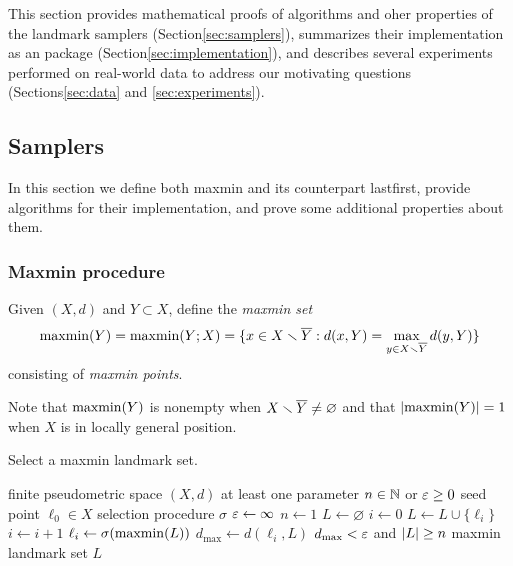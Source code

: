 \documentclass{article}
\begin{document}
\label{sec:methods}

This section provides mathematical proofs of algorithms and oher
properties of the landmark samplers (Section\nbs\ref{sec:samplers}),
summarizes their implementation as an  package
(Section\nbs\ref{sec:implementation}), and describes several experiments
performed on real-world data to address our motivating questions
(Sections\nbs\ref{sec:data} and \ref{sec:experiments}).

\hypertarget{samplers}{%
\subsection{Samplers}\label{samplers}}

\label{sec:samplers}

In this section we define both maxmin and its counterpart lastfirst,
provide algorithms for their implementation, and prove some additional
properties about them.

\hypertarget{maxmin-procedure}{%
\subsubsection{Maxmin procedure}\label{maxmin-procedure}}

\label{sec:maxmin}

\begin{definition}[maxmin]\label{def:maxmin}
    Given $(X,d)$ and $Y\subset X$, define the \emph{maxmin set}
    $$\operatorname{maxmin}(Y) = \operatorname{maxmin}(Y;X) = \{ x \in X \smallsetminus \overline{Y} : d(x,Y) = \max_{y\in X\smallsetminus \overline{Y}}{d(y,Y)} \}$$
    consisting of \emph{maxmin points}.
\end{definition}

Note that \(\operatorname{maxmin}(Y)\) is nonempty when
\(X \smallsetminus \overline{Y} \neq \varnothing\) and that \(\lvert \operatorname{maxmin}(Y)\rvert = 1\) when
\(X\) is in locally general position.

\begin{algorithm}
\caption{Select a maxmin landmark set.}
\label{alg:maxmin}
\begin{algorithmic}[1]
\REQUIRE finite pseudometric space $(X,d)$
\REQUIRE at least one parameter $n \in \mathbb{N}$ or $\varepsilon \geq 0$
\REQUIRE seed point $\ell_0 \in X$
\REQUIRE selection procedure $\sigma$
    \STATE $\varepsilon \leftarrow \infty$
\ENDIF
{}
    \STATE $n \leftarrow 1$
\ENDIF
\STATE $L \leftarrow \varnothing$
\STATE $i \leftarrow 0$
\REPEAT
    \STATE $L \leftarrow L\cup\{\ell_i\}$
    \STATE $i \leftarrow i+1$
    \STATE $\ell_i \leftarrow \sigma(\operatorname{maxmin}(L))$
    \STATE $d_{\max} \leftarrow d(\ell_i,L)$
\UNTIL $d_{\max} < \varepsilon$ and $\lvert L\rvert \geq n$
\RETURN maxmin landmark set $L$
\end{algorithmic}
\end{algorithm}
\end{document}

